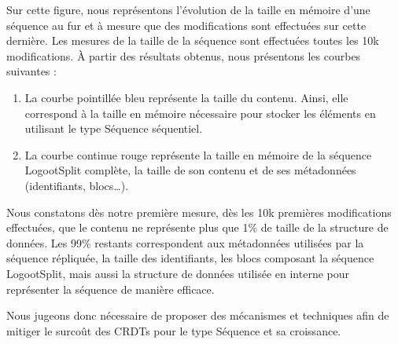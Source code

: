 Sur cette figure, nous représentons l'évolution de la taille en mémoire d'une séquence au fur et à mesure que des modifications sont effectuées sur cette dernière.
Les mesures de la taille de la séquence sont effectuées toutes les 10k modifications.
À partir des résultats obtenus, nous présentons les courbes suivantes :
\begin{enumerate}
  \item La courbe pointillée bleu représente la taille du contenu.
    Ainsi, elle correspond à la taille en mémoire nécessaire pour stocker les éléments en utilisant le type Séquence séquentiel.
  \item La courbe continue rouge représente la taille en mémoire de la séquence LogootSplit complète, \ie la taille de son contenu et de ses métadonnées (identifiants, blocs\dots).
\end{enumerate}

Nous constatons dès notre première mesure, \ie dès les 10k premières modifications effectuées, que le contenu ne représente plus que 1\% de taille de la structure de données.
Les 99\% restants correspondent aux métadonnées utilisées par la séquence répliquée, \ie la taille des identifiants, les blocs composant la séquence LogootSplit, mais aussi la structure de données utilisée en interne pour représenter la séquence de manière efficace.

Nous jugeons donc nécessaire de proposer des mécanismes et techniques afin de mitiger le surcoût des \acp{CRDT} pour le type Séquence et sa croissance.

